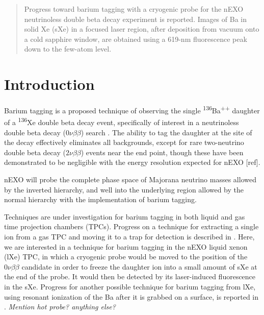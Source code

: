 \documentclass[aps,pra,reprint,superscriptaddress]{revtex4-1}
\begin{document}
\date{\today}

\begin{abstract}
Progress toward barium tagging with a cryogenic probe for the nEXO neutrinoless double beta decay experiment is reported.  Images of Ba in solid Xe (sXe) in a focused laser region, after deposition from vacuum onto a cold sapphire window, are obtained using a 619-nm fluorescence peak down to the few-atom level.

\end{abstract}


\maketitle %


\section{Introduction}

Barium tagging is a proposed technique of observing the single \textsuperscript{136}Ba\textsuperscript{++} daughter of a \textsuperscript{136}Xe double beta decay event, specifically of interest in a neutrinoless double beta decay ($0\nu\beta\beta$) search \cite{Moe1991}.  The ability to tag the daughter at the site of the decay effectively eliminates all backgrounds, except for rare two-neutrino double beta decay ($2\nu\beta\beta$) events near the end point, though these have been demonstrated to be negligible with the energy resolution expected for nEXO [ref]. 

nEXO will probe the complete phase space of Majorana neutrino masses allowed by the inverted hierarchy, and well into the underlying region allowed by the normal hierarchy with the implementation of barium tagging.  

Techniques are under investigation for barium tagging in both liquid and gas time projection chambers (TPCs).  Progress on a technique for extracting a single ion from a gas TPC and moving it to a trap for detection is described in \cite{Brunner2015}.  Here, we are interested in a technique for barium tagging in the nEXO liquid xenon (lXe) TPC, in which a cryogenic probe would be moved to the position of the $0\nu\beta\beta$ candidate in order to freeze the daughter ion into a small amount of sXe at the end of the probe.  It would then be detected by its laser-induced fluorescence in the sXe.  Progress for another possible technique for barium tagging from lXe, using resonant ionization of the Ba after it is grabbed on a surface, is reported in \cite{Twelker2014}.  \emph{{\color{gray}Mention hot probe?  anything else?}}
\end{document}
